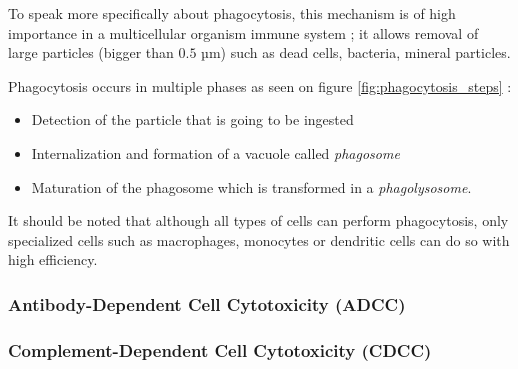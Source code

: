 To speak more specifically about phagocytosis, this mechanism is of high importance
in a multicellular organism immune system ; it allows removal of large particles
(bigger than $0.5$ µm) such as dead cells, bacteria, mineral particles.

Phagocytosis occurs in multiple phases \cite{uribe-querol_phagocytosis_2020}
as seen on figure \ref{fig:phagocytosis_steps} : 
\begin{itemize}
    \item Detection of the particle that is going to be ingested
    \item Internalization and formation of a vacuole called \emph{phagosome}
    \item Maturation of the phagosome which is transformed in a \emph{phagolysosome}.
\end{itemize}



It should be noted that although all types of cells can perform phagocytosis,
only specialized cells such as macrophages, monocytes or dendritic cells can
do so with high efficiency.

\subsubsection{Antibody-Dependent Cell Cytotoxicity (ADCC)}

\subsubsection{Complement-Dependent Cell Cytotoxicity (CDCC)}
